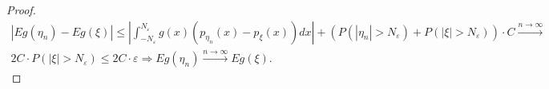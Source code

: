 \begin{proof}
\begin{gather*}
    | Eg( \eta _{n}) -Eg( \xi )| \leqslant \left| \int _{-N_{\varepsilon }}^{N_{\varepsilon }} g( x)( p_{\eta _{n}}( x) -p_{\xi }( x))dx\right| + (P(| \eta _{n}|  >N_{\varepsilon }) + P( |\xi | >N_{\varepsilon })) \cdotp C \xrightarrow{n\rightarrow\infty}\\ 2C\cdotp P(| \xi |  >N_{\varepsilon }) \leqslant 2C\cdotp \varepsilon \Rightarrow Eg( \eta _{n})\xrightarrow{n\rightarrow\infty} Eg( \xi ) .
\end{gather*}
\end{proof}
